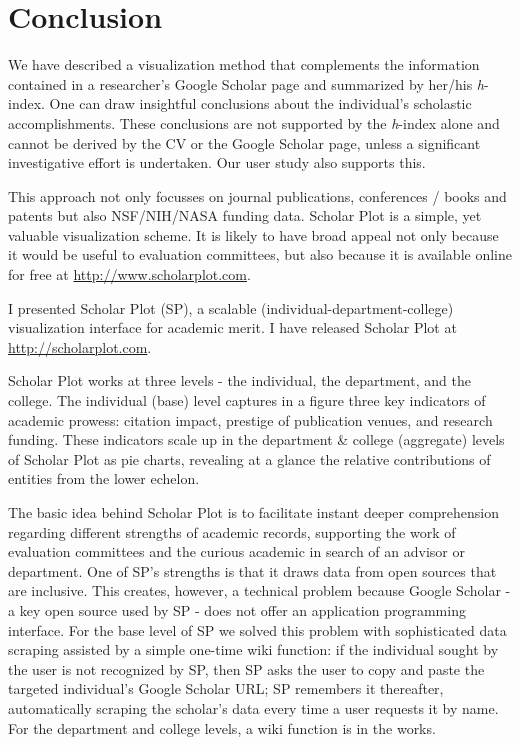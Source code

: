 \chapter{Conclusion}\label{chap:Conclusion}
We have described a visualization method that complements the information contained in a researcher's Google Scholar page and summarized by her/his {\it h}-index. One can draw insightful conclusions about the individual's scholastic accomplishments. These conclusions are not supported by the {\it h}-index alone and cannot be derived by the CV or the Google Scholar page, unless a significant investigative effort is undertaken. Our user study also supports this.

This approach not only focusses on journal publications, conferences / books and patents but also NSF/NIH/NASA funding data. Scholar Plot is a simple, yet valuable visualization scheme. It is likely to have broad appeal not only because it would be useful to evaluation committees, but also because it is available online for free at \url{http://www.scholarplot.com}.


I presented Scholar Plot (SP), a scalable (individual-department-college) visualization interface for academic merit. I have released Scholar Plot at \href{http://scholarplot.com}{http://scholarplot.com}.

Scholar Plot works at three levels - the individual, the department, and the college. The individual (base) level captures in a figure three key indicators of academic prowess: citation impact, prestige of publication venues, and research funding. These indicators scale up in the department \& college (aggregate) levels of Scholar Plot as pie charts, revealing at a glance the relative contributions of entities from the lower echelon.

The basic idea behind Scholar Plot is to facilitate instant deeper comprehension regarding different strengths of academic records, supporting the work of evaluation committees and the curious academic in search of an advisor or department. One of SP's strengths is that it draws data from open sources that are inclusive. This creates, however, a technical problem because Google Scholar - a key open source used by SP - does not offer an application programming interface. For the base level of SP we solved this problem with sophisticated data scraping assisted by a simple one-time wiki function: if the individual sought by the user is not recognized by SP, then SP asks the user to copy and paste the targeted individual's Google Scholar URL; SP remembers it thereafter, automatically scraping the scholar's data every time a user requests it by name. For the department and college levels, a wiki function is in the works.

